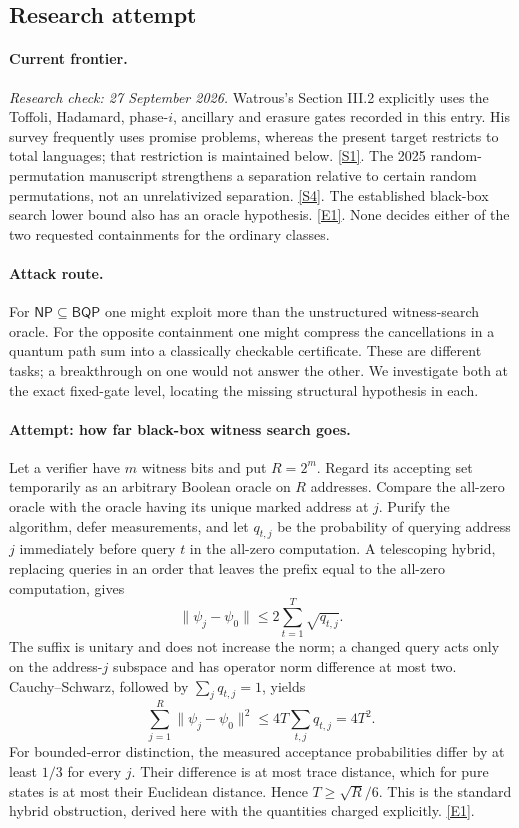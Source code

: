 \documentclass[11pt,a4paper]{article}
\newcommand{\sref}[2]{\hyperlink{source:#1:#2}{[S#2]}}
\newcommand{\eref}[2]{\hyperlink{extra:#1:#2}{[E#2]}}
\begin{document}
\subsection{Research attempt}
\paragraph{Current frontier.}
\textit{Research check: 27 September 2026.}
Watrous's Section III.2 explicitly uses the Toffoli, Hadamard, phase-$i$,
ancillary and erasure gates recorded in this entry. His survey frequently
uses promise problems, whereas the present target restricts to total
languages; that restriction is maintained below. \sref{statement}{1}.
The 2025 random-permutation manuscript strengthens a separation relative
to certain random permutations, not an unrelativized separation.
\sref{statement}{4}. The established black-box search lower bound also has an
oracle hypothesis. \eref{statement}{1}. None decides either of the two requested
containments for the ordinary classes.

\paragraph{Attack route.}
For $\mathsf{NP}\subseteq\mathsf{BQP}$ one might exploit more than the
unstructured witness-search oracle. For the opposite containment one might
compress the cancellations in a quantum path sum into a classically
checkable certificate. These are different tasks; a breakthrough on one
would not answer the other. We investigate both at the exact fixed-gate
level, locating the missing structural hypothesis in each.

\paragraph{Attempt: how far black-box witness search goes.}
Let a verifier have $m$ witness bits and put $R=2^m$. Regard its accepting
set temporarily as an arbitrary Boolean oracle on $R$ addresses. Compare
the all-zero oracle with the oracle having its unique marked address at
$j$. Purify the algorithm, defer measurements, and let $q_{t,j}$ be the
probability of querying address $j$ immediately before query $t$ in the
all-zero computation. A telescoping hybrid, replacing queries in an order
that leaves the prefix equal to the all-zero computation, gives
\[
 \|\psi_j-\psi_0\|\leq2\sum_{t=1}^T\sqrt{q_{t,j}}.
\]
The suffix is unitary and does not increase the norm; a changed query
acts only on the address-$j$ subspace and has operator norm difference
at most two. Cauchy--Schwarz, followed by $\sum_jq_{t,j}=1$, yields
\[
 \sum_{j=1}^R\|\psi_j-\psi_0\|^2\leq4T\sum_{t,j}q_{t,j}=4T^2.
 \tag{16.1}
\]
For bounded-error distinction, the measured acceptance probabilities differ
by at least $1/3$ for every $j$. Their difference is at most trace distance,
which for pure states is at most their Euclidean distance. Hence
$T\geq\sqrt R/6$. This is the standard hybrid obstruction, derived here
with the quantities charged explicitly. \eref{statement}{1}.
\end{document}
